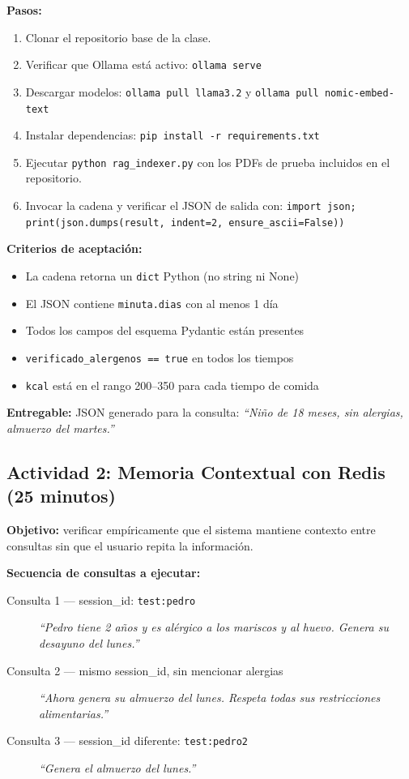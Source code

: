 \documentclass[12pt,a4paper]{article}
\begin{document}
\textbf{Pasos:}
\begin{enumerate}
  \item Clonar el repositorio base de la clase.
  \item Verificar que Ollama está activo: \texttt{ollama serve}
  \item Descargar modelos: \texttt{ollama pull llama3.2} y
    \texttt{ollama pull nomic-embed-text}
  \item Instalar dependencias: \texttt{pip install -r requirements.txt}
  \item Ejecutar \texttt{python rag\_indexer.py} con los PDFs de prueba
    incluidos en el repositorio.
  \item Invocar la cadena y verificar el JSON de salida con:
    \texttt{import json; print(json.dumps(result, indent=2, ensure\_ascii=False))}
\end{enumerate}

\textbf{Criterios de aceptación:}
\begin{itemize}[noitemsep]
  \item La cadena retorna un \texttt{dict} Python (no string ni None)
  \item El JSON contiene \texttt{minuta.dias} con al menos 1 día
  \item Todos los campos del esquema Pydantic están presentes
  \item \texttt{verificado\_alergenos == true} en todos los tiempos
  \item \texttt{kcal} está en el rango 200--350 para cada tiempo de comida
\end{itemize}

\textbf{Entregable:} JSON generado para la consulta:
\textit{``Niño de 18 meses, sin alergias, almuerzo del martes.''}

\subsection{Actividad 2: Memoria Contextual con Redis (25 minutos)}

\textbf{Objetivo:} verificar empíricamente que el sistema mantiene contexto
entre consultas sin que el usuario repita la información.

\textbf{Secuencia de consultas a ejecutar:}

\begin{description}
  \item[Consulta 1 --- session\_id: \texttt{test:pedro}]
    \textit{``Pedro tiene 2 años y es alérgico a los mariscos y al
    huevo. Genera su desayuno del lunes.''}

  \item[Consulta 2 --- mismo session\_id, sin mencionar alergias]
    \textit{``Ahora genera su almuerzo del lunes. Respeta todas sus
    restricciones alimentarias.''}

  \item[Consulta 3 --- session\_id diferente: \texttt{test:pedro2}]
    \textit{``Genera el almuerzo del lunes.''}
\end{description}
\end{document}
